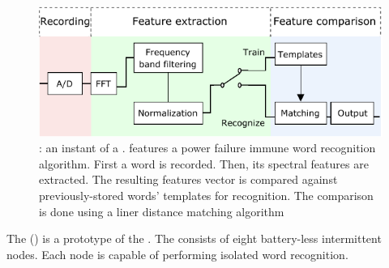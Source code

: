\begin{figure}
	\centering
	\includegraphics[width=\columnwidth]{figures/cis}
	\caption{\fullCIM: an instant of a \fullcis. \cim features a power failure immune word recognition algorithm. First a word is recorded. Then, its spectral features are extracted. The resulting features vector is compared against previously-stored words' templates for recognition. The comparison is done using a liner distance matching algorithm}
	\label{fig:cis}
\end{figure}
%
The \fullcim (\cim) is a prototype of the \fullcis. The \cim consists of eight battery-less intermittent nodes. Each node is capable of performing isolated word recognition. 




